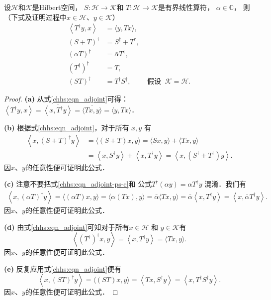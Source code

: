 \begin{theorem}
设$\mathcal{H}$和$\mathcal{K}$是Hilbert空间，
$S:\mathcal{H} \longrightarrow \mathcal{K}$和
$T:\mathcal{H} \longrightarrow \mathcal{K}$是有界线性算符，
$\alpha \in \mathbb{C}$，
则（下式及证明过程中$x \in \mathcal{H}$、$y \in \mathcal{K}$）
\begin{subequations}\label{chhs:eqn_adjoint-ps}
\begin{align}
	\left\langle T^{\dagger} y, x\right\rangle & =\langle y, T x\rangle,  \\
	(S+T)^{\dagger} & =S^{\dagger}+T^{\dagger},  \label{chhs:eqn_adjoint-ps-b} \\
	(\alpha T)^{\dagger} & =\bar{\alpha} T^{\dagger},  \label{chhs:eqn_adjoint-ps-c}\\
	(T^{\dagger})^{\dagger} & =T,  \\
	(S T)^{\dagger} & =T^{\dagger} S^{\dagger}, \qquad \text { 假设 }\ \mathcal{K}=\mathcal{H} . 
\end{align}
\end{subequations}
\end{theorem}

\begin{proof}
{\bfseries (a)} 从式\eqref{chhs:eqn_adjoint}可得：
$ \left\langle T^{\dagger} y, x\right\rangle 
=\overline{\left\langle x, T^{\dagger} y\right\rangle}
=\overline{\langle T x, y\rangle}=\langle y, T x\rangle$．

{\bfseries (b)} 根据式\eqref{chhs:eqn_adjoint}，对于所有 $x, y$ 有
\begin{align*}
	\left\langle x,(S+T)^{\dagger} y\right\rangle & =\langle(S+T) x, y\rangle 
	=\langle S x, y\rangle+\langle T x, y\rangle \\
	& =\left\langle x, S^{\dagger} y\right\rangle+\left\langle x, T^{\dagger} y\right\rangle 
	=\left\langle x,\left(S^{\dagger}+T^{\dagger}\right) y\right\rangle .
\end{align*}
因$x$、$y$的任意性便可证明此公式．

{\bfseries (c)} 注意不要把式\eqref{chhs:eqn_adjoint-ps-c}和
公式$T^{\dagger}(\alpha y)=\alpha T^{\dagger} y$ 混淆．我们有
\begin{align*}
	\left\langle x, (\alpha T)^{\dagger} y\right\rangle
	=\langle (\alpha T) x, y\rangle
	=\langle \alpha(T x), y\rangle
	=\bar{\alpha}\langle T x, y\rangle
	=\bar{\alpha}\left\langle x, T^{\dagger} y\right\rangle
	=\left\langle x, \bar{\alpha} T^{\dagger} y\right\rangle .
\end{align*}
因$x$、$y$的任意性便可证明此公式．


{\bfseries (d)} 由式\eqref{chhs:eqn_adjoint}可知对于所有$x \in \mathcal{H}$ 和 $y \in \mathcal{K}$有
$$\left\langle(T^{\dagger})^{\dagger} x, y\right\rangle
=\left\langle x, T^{\dagger} y\right\rangle=\langle T x, y\rangle . $$
因$x$、$y$的任意性便可证明此公式．


{\bfseries (e)} 反复应用式\eqref{chhs:eqn_adjoint}便有
$$\left\langle x,(S T)^{\dagger} y\right\rangle
=\langle(S T) x, y\rangle=\left\langle T x, S^{\dagger} y\right\rangle
=\left\langle x, T^{\dagger} S^{\dagger} y\right\rangle . $$
因$x$、$y$的任意性便可证明此公式．
\end{proof}


